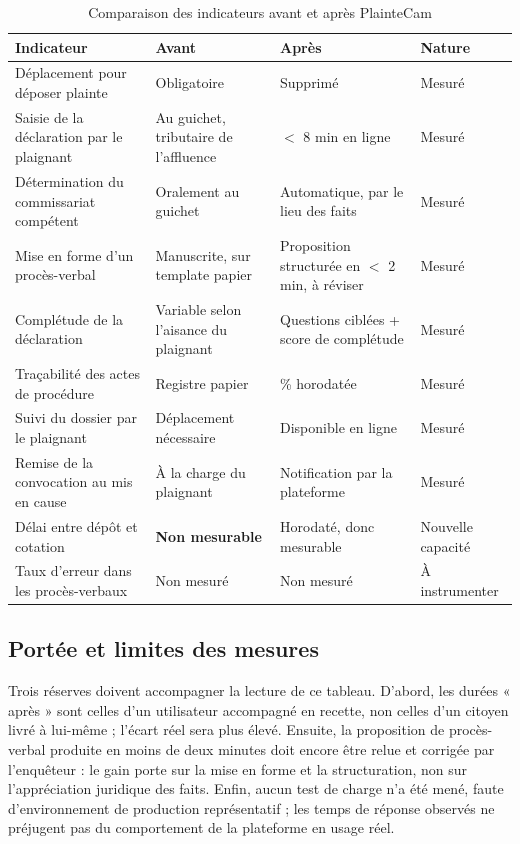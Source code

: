 \begin{table}[H]
    \centering
    \begin{tabularx}{\textwidth}{|>{\raggedright\arraybackslash}X|>{\raggedright\arraybackslash}p{2.4cm}|>{\raggedright\arraybackslash}p{2.9cm}|>{\raggedright\arraybackslash}p{2.2cm}|}
        \hline
        \textbf{Indicateur} & \textbf{Avant} & \textbf{Après} & \textbf{Nature} \\
        \hline
        Déplacement pour déposer plainte & Obligatoire & Supprimé & Mesuré \\
        \hline
        Saisie de la déclaration par le plaignant & Au guichet, tributaire de l'affluence & $<$ 8 min en ligne & Mesuré \\
        \hline
        Détermination du commissariat compétent & Oralement au guichet & Automatique, par le lieu des faits & Mesuré \\
        \hline
        Mise en forme d'un procès-verbal & Manuscrite, sur template papier & Proposition structurée en $<$ 2 min, à réviser & Mesuré \\
        \hline
        Complétude de la déclaration & Variable selon l'aisance du plaignant & Questions ciblées + score de complétude & Mesuré \\
        \hline
        Traçabilité des actes de procédure & Registre papier & 100\% horodatée & Mesuré \\
        \hline
        Suivi du dossier par le plaignant & Déplacement nécessaire & Disponible en ligne & Mesuré \\
        \hline
        Remise de la convocation au mis en cause & À la charge du plaignant & Notification par la plateforme & Mesuré \\
        \hline
        Délai entre dépôt et cotation & \textbf{Non mesurable} & Horodaté, donc mesurable & Nouvelle capacité \\
        \hline
        Taux d'erreur dans les procès-verbaux & Non mesuré & Non mesuré & À instrumenter \\
        \hline
    \end{tabularx}
    \caption{Comparaison des indicateurs avant et après PlainteCam}
    \label{tab:resultats}
\end{table}

\subsection{Portée et limites des mesures}

Trois réserves doivent accompagner la lecture de ce tableau. D'abord, les durées « après » sont celles d'un utilisateur accompagné en recette, non celles d'un citoyen livré à lui-même ; l'écart réel sera plus élevé. Ensuite, la proposition de procès-verbal produite en moins de deux minutes doit encore être relue et corrigée par l'enquêteur : le gain porte sur la mise en forme et la structuration, non sur l'appréciation juridique des faits. Enfin, aucun test de charge n'a été mené, faute d'environnement de production représentatif ; les temps de réponse observés ne préjugent pas du comportement de la plateforme en usage réel.

